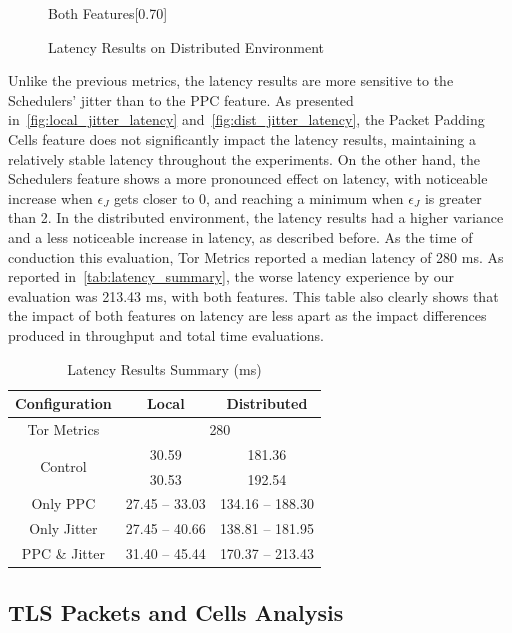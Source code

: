 \begin{figure}[htbp]
\begin{subcaptionbox}{Both Features\label{fig:dist_both_latency}}[0.70\textwidth]
    \end{subcaptionbox}
    \caption{Latency Results on Distributed Environment}\label{fig:dist_latency}
\end{figure}

Unlike the previous metrics, the latency results are more sensitive to the Schedulers' jitter than to the PPC feature. As presented in~\autoref{fig:local_jitter_latency} and~\autoref{fig:dist_jitter_latency}, the Packet Padding Cells feature does not significantly impact the latency results, maintaining a relatively stable latency throughout the experiments. On the other hand, the Schedulers feature shows a more pronounced effect on latency, with noticeable increase when $\epsilon_{J}$ gets closer to 0, and reaching a minimum when $\epsilon_{J}$ is greater than 2. In the distributed environment, the latency results had a higher variance and a less noticeable increase in latency, as described before.
As the time of conduction this evaluation, Tor Metrics reported a median latency of 280 ms. As reported in~\autoref{tab:latency_summary}, the worse latency experience by our evaluation was 213.43 ms, with both features. This table also clearly shows that the impact of both features on latency are less apart as the impact differences produced in throughput and total time evaluations. 
\begin{table}[htbp]
    \centering
    \begin{tabular}{|c|c|c|}
    \hline
    \textbf{Configuration} & \textbf{Local} & \textbf{Distributed}\\
    \hline
    Tor Metrics & \multicolumn{2}{c|}{280}  \\ 
    \hline
    \multirow{2}{*}{Control} & 30.59 & 181.36 \\ 
    & 30.53 & 192.54\\
    \hline
    Only PPC & 27.45 – 33.03 & 134.16 – 188.30\\
    \hline
    Only Jitter & 27.45 – 40.66 & 138.81 – 181.95 \\
    \hline
    PPC \& Jitter & 31.40 – 45.44 & 170.37 – 213.43\\
    \hline
    \end{tabular}
    \caption{Latency Results Summary (ms)}\label{tab:latency_summary}
\end{table}

\FloatBarrier
\subsection{TLS Packets and Cells Analysis}

